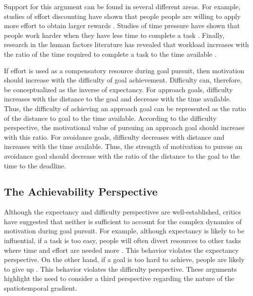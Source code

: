 \documentclass[a4paper,doc,natbib,donotrepeattitle]{apa6}
\begin{document}
Support for this argument can be found in several different areas. For example, studies of effort discounting have shown that people people are willing to apply more effort to obtain larger rewards \citep{Libedinsky2013,Westbrook2013}. Studies of time pressure have shown that people work harder when they have less time to complete a task \citep{Bryan1967,Latham1975,Peters1984}. Finally, research in the human factors literature has revealed that workload increases with the ratio of the time required to complete a task to the time available \citep{Hendy1997}.

If effort is used as a compensatory resource during goal pursuit, then motivation should increase with the difficulty of goal achievement. Difficulty can, therefore, be conceptualized as the inverse of expectancy. For approach goals, difficulty increases with the distance to the goal and decrease with the time available. Thus, the difficulty of achieving an approach goal can be represented as the ratio of the distance to goal to the time available. According to the difficulty perspective, the motivational value of pursuing an approach goal should increase with this ratio. For avoidance goals, difficulty decreases with distance and increases with the time available. Thus, the strength of motivation to pursue an avoidance goal should decrease with the ratio of the distance to the goal to the time to the deadline.


\subsection{The Achievability Perspective}

Although the expectancy and difficulty perspectives are well-established, critics have suggested that neither is sufficient to account for the complex dynamics of motivation during goal pursuit. For example, although expectancy is likely to be influential, if a task is too easy, people will often divert resources to other tasks where time and effort are needed more \citep{Carver1998,Louro2007}. This behavior violates the expectancy perspective. On the other hand, if a goal is too hard to achieve, people are likely to give up \citep{Schmidt2009,Vancouver2010}. This behavior violates the difficulty perspective. These arguments highlight the need to consider a third perspective regarding the nature of the spatiotemporal gradient.
\end{document}

